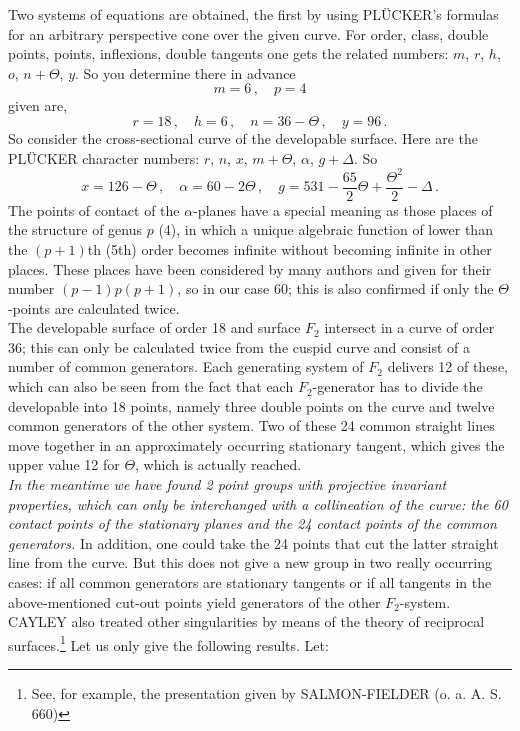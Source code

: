 \documentclass[leqno]{article}
\begin{document}
Two systems of equations are obtained, the first by using PL\"UCKER's formulas for an arbitrary perspective cone over the given curve. For order, class, double points, points, inflexions, double tangents one gets the related numbers: $ m $, $ r $, $ h $, $ o $, $ n + \Theta $, $ y $. So you determine there in advance
\[
m=6 \, , \quad p=4
\]
given are,
\[
r = 18 \, , \quad h = 6 \, , \quad n = 36-\Theta \, , \quad y = 96 \, .
\]
So consider the cross-sectional curve of the developable surface. Here are the PL\"UCKER character numbers: $r$, $n$, $x$, $m+\Theta$, $\alpha$, $g+\Delta$. So 
\[
x = 126-\Theta \, , \quad \alpha=60-2\Theta \, , \quad g = 531-\frac{65}{2}\Theta + \frac{\Theta^2}{2} - \Delta \, . 
\]
The points of contact of the $ \alpha$-planes have a special meaning as those places of the structure of genus $p$ (4), in which a unique algebraic function of lower than the $(p + 1)$th (5th) order becomes infinite without becoming infinite in other places. These places have been considered by many authors and given for their number $ (p-1) p (p + 1) $, so in our case 60; this is also confirmed if only the $ \Theta$-points are calculated twice. \\
The developable surface of order 18 and surface $ F_2 $ intersect in a curve of order 36; this can only be calculated twice from the cuspid curve and consist of a number of common generators. Each generating system of $ F_2 $ delivers 12 of these, which can also be seen from the fact that each $ F_2$-generator has to divide the developable into 18 points, namely three double points on the curve and twelve common generators of the other system. Two of these 24 common straight lines move together in an approximately occurring stationary tangent, which gives the upper value 12 for $ \Theta $, which is actually reached. \\
\textit{In the meantime we have found 2 point groups with projective invariant properties, which can only be interchanged with a collineation of the curve: the 60 contact points of the stationary planes and the 24 contact points of the common generators.} In addition, one could take the 24 points that cut the latter straight line from the curve. But this does not give a new group in two really occurring cases: if all common generators are stationary tangents or if all tangents in the above-mentioned cut-out points yield generators of the other $ F_2 $-system. \\
CAYLEY also treated other singularities by means of the theory of reciprocal surfaces.\footnote{See, for example, the presentation given by SALMON-FIELDER (o. a. A. S. 660)} Let us only give the following results. Let:
\end{document}
